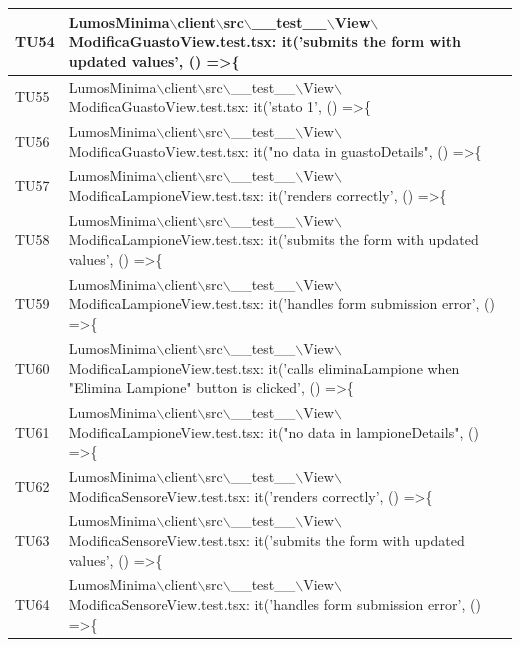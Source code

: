 \documentclass[12pt]{article}
\begin{document}
\begin{xltabular}{\linewidth}{|>{\hsize}X|X|}
	TU54 & LumosMinima$\backslash$client$\backslash$src$\backslash$\_\_test\_\_$\backslash$View$\backslash$ModificaGuastoView.test.tsx: it('submits the form with updated values', () =\textgreater \{ \\ \hline
	TU55 & LumosMinima$\backslash$client$\backslash$src$\backslash$\_\_test\_\_$\backslash$View$\backslash$ModificaGuastoView.test.tsx: it('stato 1', () =\textgreater \{ \\ \hline
	TU56 & LumosMinima$\backslash$client$\backslash$src$\backslash$\_\_test\_\_$\backslash$View$\backslash$ModificaGuastoView.test.tsx: it("no data in guastoDetails", () =\textgreater \{ \\ \hline
	TU57 & LumosMinima$\backslash$client$\backslash$src$\backslash$\_\_test\_\_$\backslash$View$\backslash$ModificaLampioneView.test.tsx: it('renders correctly', () =\textgreater \{ \\ \hline
	TU58 & LumosMinima$\backslash$client$\backslash$src$\backslash$\_\_test\_\_$\backslash$View$\backslash$ModificaLampioneView.test.tsx: it('submits the form with updated values', () =\textgreater \{ \\ \hline
	TU59 & LumosMinima$\backslash$client$\backslash$src$\backslash$\_\_test\_\_$\backslash$View$\backslash$ModificaLampioneView.test.tsx: it('handles form submission error', () =\textgreater \{ \\ \hline
	TU60 & LumosMinima$\backslash$client$\backslash$src$\backslash$\_\_test\_\_$\backslash$View$\backslash$ModificaLampioneView.test.tsx: it('calls eliminaLampione when "Elimina Lampione" button is clicked', () =\textgreater \{ \\ \hline
	TU61 & LumosMinima$\backslash$client$\backslash$src$\backslash$\_\_test\_\_$\backslash$View$\backslash$ModificaLampioneView.test.tsx: it("no data in lampioneDetails", () =\textgreater \{ \\ \hline
	TU62 & LumosMinima$\backslash$client$\backslash$src$\backslash$\_\_test\_\_$\backslash$View$\backslash$ModificaSensoreView.test.tsx: it('renders correctly', () =\textgreater \{ \\ \hline
	TU63 & LumosMinima$\backslash$client$\backslash$src$\backslash$\_\_test\_\_$\backslash$View$\backslash$ModificaSensoreView.test.tsx: it('submits the form with updated values', () =\textgreater \{ \\ \hline
	TU64 & LumosMinima$\backslash$client$\backslash$src$\backslash$\_\_test\_\_$\backslash$View$\backslash$ModificaSensoreView.test.tsx: it('handles form submission error', () =\textgreater \{ \\ \hline

\end{xltabular}
\end{document}
